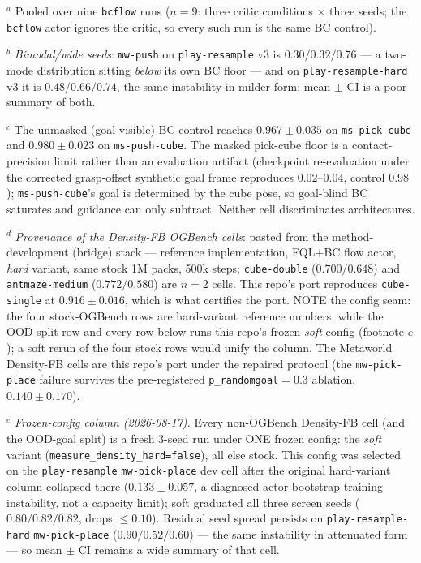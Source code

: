 \documentclass[10pt]{article}
\begin{document}
$^{a}$ Pooled over nine \texttt{bcflow} runs ($n{=}9$: three critic conditions $\times$
three seeds; the \texttt{bcflow} actor ignores the critic, so every such run is the same
BC control).

$^{b}$ \emph{Bimodal/wide seeds}: \texttt{mw-push} on \texttt{play-resample} v3 is
$0.30/0.32/0.76$ --- a two-mode distribution sitting \emph{below} its own BC floor ---
and on \texttt{play-resample-hard} v3 it is $0.48/0.66/0.74$, the same instability in
milder form; mean $\pm$ CI is a poor summary of both.

$^{c}$ The unmasked (goal-visible) BC control reaches $0.967\pm0.035$ on
\texttt{ms-pick-cube} and $0.980\pm0.023$ on \texttt{ms-push-cube}. The masked pick-cube
floor is a contact-precision limit rather than an evaluation artifact (checkpoint
re-evaluation under the corrected grasp-offset synthetic goal frame reproduces
$0.02$--$0.04$, control $0.98$); \texttt{ms-push-cube}'s goal is determined by the cube
pose, so goal-blind BC saturates and guidance can only subtract. Neither cell
discriminates architectures.

$^{d}$ \emph{Provenance of the Density-FB OGBench cells}: pasted from the
method-development (bridge) stack --- reference implementation, FQL$+$BC flow actor,
\emph{hard} variant, same stock 1M packs, 500k steps; \texttt{cube-double} ($0.700/0.648$)
and \texttt{antmaze-medium} ($0.772/0.580$) are $n{=}2$ cells. This repo's port reproduces
\texttt{cube-single} at $0.916\pm0.016$, which is what certifies the port. NOTE the config
seam: the four stock-OGBench rows are hard-variant reference numbers, while the OOD-split
row and every row below runs this repo's frozen \emph{soft} config (footnote $e$); a soft
rerun of the four stock rows would unify the column. The Metaworld Density-FB cells are this
repo's port under the repaired protocol (the \texttt{mw-pick-place} failure survives the
pre-registered \texttt{p\_randomgoal}$=0.3$ ablation, $0.140\pm0.170$).

$^{e}$ \emph{Frozen-config column (2026-08-17).} Every non-OGBench Density-FB cell (and the
OOD-goal split) is a fresh 3-seed run under ONE frozen config: the \emph{soft} variant
(\texttt{measure\_density\_hard=false}), all else stock. This config was selected on the
\texttt{play-resample} \texttt{mw-pick-place} dev cell after the original hard-variant
column collapsed there ($0.133\pm0.057$, a diagnosed actor-bootstrap training instability,
not a capacity limit); soft graduated all three screen seeds ($0.80/0.82/0.82$, drops
$\le0.10$). Residual seed spread persists on \texttt{play-resample-hard}
\texttt{mw-pick-place} ($0.90/0.52/0.60$) --- the same instability in attenuated form ---
so mean $\pm$ CI remains a wide summary of that cell.
\end{document}
